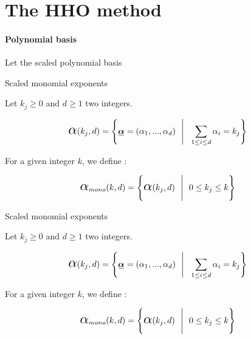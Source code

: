 \documentclass[fleqn]{article}
\begin{document}
  \section{The HHO method}
    
      \paragraph{Polynomial basis}

        Let the scaled polynomial basis

        \begin{defbox}{Scaled monomial exponents}

          Let $k_j \geq 0$ and $d \geq 1$ two integers.

          \begin{equation}
            \captize{\alpha}(k_j,d) =
            \Bigg\{
              \tensori{\alpha} = (\alpha_1, ..., \alpha_{d})
              \ \ \Bigg\vert \ \ 
              \sum_{1 \leq i \leq d} \alpha_i = k_j
            \Bigg\}
          \end{equation}

          For a given integer $k$, we define :

          \begin{equation}
            \captize{\alpha}_{mono}(k,d) =
            \Bigg\{
              \captize{\alpha}(k_j,d)
              \ \ \Bigg\vert \ \ 
              0 \leq k_j \leq k
            \Bigg\}
          \end{equation}

        \end{defbox}
        
        \begin{infobox}{Scaled monomial exponents}

          Let $k_j \geq 0$ and $d \geq 1$ two integers.

          \begin{equation}
            \captize{\alpha}(k_j,d) =
            \Bigg\{
              \tensori{\alpha} = (\alpha_1, ..., \alpha_{d})
              \ \ \Bigg\vert \ \ 
              \sum_{1 \leq i \leq d} \alpha_i = k_j
            \Bigg\}
          \end{equation}

          For a given integer $k$, we define :

          \begin{equation}
            \captize{\alpha}_{mono}(k,d) =
            \Bigg\{
              \captize{\alpha}(k_j,d)
              \ \ \Bigg\vert \ \ 
              0 \leq k_j \leq k
            \Bigg\}
          \end{equation}

        \end{infobox}
\end{document}
